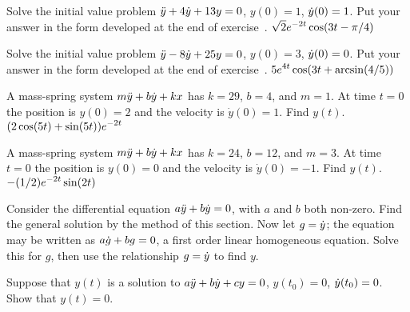 \exercise Solve the initial value problem 
$\displaystyle\ddot y+4\dot y+13y=0$,
$y(0)=1$, $\displaystyle\dot y(0)=1$. Put your answer in the form developed
at the end of exercise~.
\answer $\displaystyle \sqrt2 e^{-2t}\cos(3t-\pi/4)$
\endanswer
\endexercise

\exercise Solve the initial value problem 
$\displaystyle\ddot y-8\dot y+25y=0$,
$y(0)=3$, $\displaystyle\dot y(0)=0$. Put your answer in the form developed
at the end of exercise~.
\answer $\displaystyle 5e^{4t}\cos(3t+\arcsin(4/5))$
\endanswer
\endexercise

\exercise A mass-spring system $\displaystyle m\ddot y+b\dot y+kx$ has
$k=29$, $b=4$, and $m=1$. At time $t=0$ the position is $y(0)=2$ and
the velocity is $\dot y(0)=1$. Find $y(t)$.
\answer $\displaystyle (2\cos(5t)+\sin(5t))e^{-2t}$
\endanswer
\endexercise

\exercise A mass-spring system $\displaystyle m\ddot y+b\dot y+kx$ has
$k=24$, $b=12$, and $m=3$. At time $t=0$ the position is $y(0)=0$ and
the velocity is $\dot y(0)=-1$. Find $y(t)$.
\answer $\displaystyle-(1/2)e^{-2t}\sin(2t)$
\endanswer
\endexercise

\exercise Consider 
the differential equation $\displaystyle a\ddot y + b\dot
y=0$, with $a$ and $b$ both non-zero. Find the general solution by the
method of this section. Now let $\displaystyle g=\dot y$; the equation may be
written as $\displaystyle a\dot g+bg=0$, a first order linear homogeneous
equation. Solve this for $g$, then use the relationship $\displaystyle g=\dot y$ to
find $y$.

\endexercise

\exercise Suppose that $y(t)$ is a solution to $\displaystyle a\ddot y+b\dot
y+cy=0$, $y(t_0)=0$, $\displaystyle\dot y(t_0)=0$. Show that $y(t)=0$.
\endexercise

\endexercises
